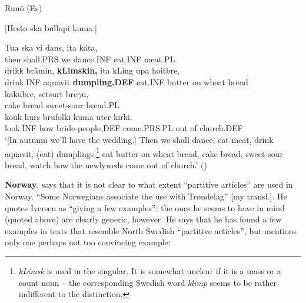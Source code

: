 
\item 

\label{bkm:Ref136427219}Runö (Es)



[Hesto ska bullupi kuma.] 


 \ea\label{}
\gll Tua  ska  vi  dans,  ita  käta,\\


then   shall.PRS  we  dance.INF  eat.INF  meat.PL\\

 \ea\label{}
\gll drikk  brämin,  \textbf{kLimskin,} ita  kLing  upa  hoitbre,\\


drink.INF  aquavit  \textbf{dumpling.DEF  } eat.INF  butter  on  wheat bread\\

 \ea\label{}
\gll kakubre,  setsurt  bre$\gamma $u,\\


cake bread  sweet-sour  bread.PL\\

 \ea\label{}
\gll kouk  hurs  brufolki  kuma  uter  kirki.\\


look.INF  how  bride-people.DEF  come.PRS.PL  out of   church.DEF\\

\glt ‘[In autumn we’ll have the wedding.] Then we shall dance, eat meat, drink aquavit, (eat) dumplings,\footnote{ \textit{k}\textit{L}\textit{imsk} is used in the singular. It is somewhat unclear if it is a mass or a count noun – the corresponding Swedish word \textit{klimp} seems to be rather indifferent to the distinction.  } eat butter on wheat bread, cake bread, sweet-sour bread, watch how the newlyweds come out of church.’ (\citet[76]{Vendell1882})

\z

\textbf{Norway}. \citet[16]{Delsing2003a} says that it is not clear to what extent “partitive articles” are used in Norway. “Some Norwegians associate the use with Trøndelag” [my transl.]. He quotes Iversen as “giving a few examples”; the ones he seems to have in mind (quoted above) are clearly generic, however. He says that he has found a few examples in texts that resemble North Swedish “partitive articles”, but mentions only one perhaps not too convincing example: 

